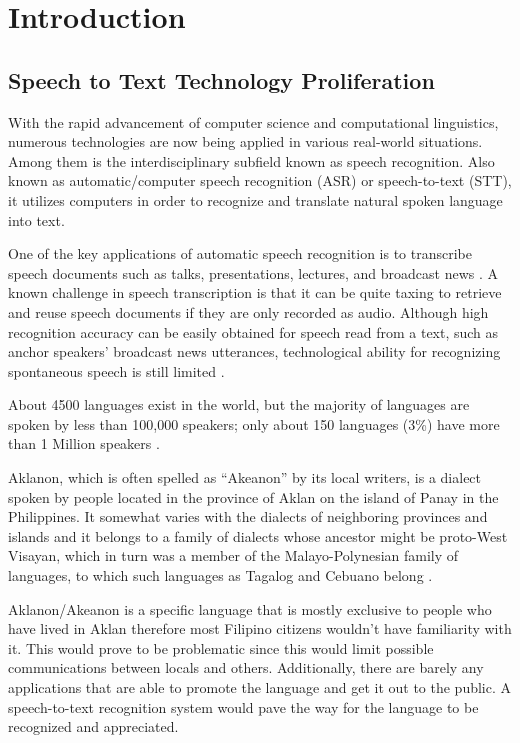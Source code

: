 \chapter{Introduction}

\section{Speech to Text Technology Proliferation}

With the rapid advancement of computer science and computational linguistics, numerous technologies are now being applied in various real-world situations. Among them is the interdisciplinary subfield known as speech recognition. Also known as automatic/computer speech recognition (ASR) or speech-to-text (STT), it utilizes computers in order to recognize and translate natural spoken language into text.

One of the key applications of automatic speech recognition is to transcribe speech documents such as talks, presentations, lectures, and broadcast news \cite{furui2004speech}. A known challenge in speech transcription is that it can be quite taxing to retrieve and reuse speech documents if they are only recorded as audio. Although high recognition accuracy can be easily obtained for speech read from a text, such as anchor speakers’ broadcast news utterances, technological ability for recognizing spontaneous speech is still limited \cite{furui2004speech}.

About 4500 languages exist in the world, but the majority of languages are spoken by less than 100,000 speakers; only about 150 languages (3\%) have more than 1 Million speakers \cite{schultz2002globalphone}.

Aklanon, which is often spelled as “Akeanon” by its local writers, is a dialect spoken by people located in the province of Aklan on the island of Panay in the Philippines. It somewhat varies with the dialects of neighboring provinces and islands and it belongs to a family of dialects whose ancestor might be proto-West Visayan, which in turn was a member of the Malayo-Polynesian family of languages, to which such languages as Tagalog and Cebuano belong \cite{de1968study}.

Aklanon/Akeanon is a specific language that is mostly exclusive to people who have lived in Aklan therefore most Filipino citizens wouldn’t have familiarity with it. This would prove to be problematic since this would limit possible communications between locals and others. Additionally, there are barely any applications that are able to promote the language and get it out to the public. A speech-to-text recognition system would pave the way for the language to be recognized and appreciated.

